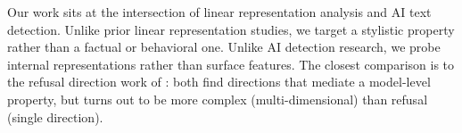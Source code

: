 Our work sits at the intersection of linear representation analysis and AI text detection.
Unlike prior linear representation studies, we target a stylistic property rather than a factual or behavioral one.
Unlike AI detection research, we probe internal representations rather than surface features.
The closest comparison is to the refusal direction work of \citet{arditi2024refusal}: both find directions that mediate a model-level property, but \aistyle turns out to be more complex (multi-dimensional) than refusal (single direction).
